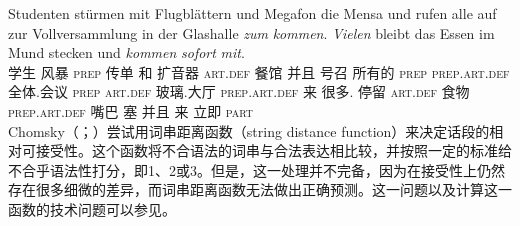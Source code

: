 \ea
\gll Studenten stürmen mit Flugblättern und Megafon die Mensa und rufen alle auf zur Vollversammlung in der Glashalle \emph{zum} \emph{kommen}. \emph{Vielen} bleibt das Essen im Mund stecken und \emph{kommen} \emph{sofort} \emph{mit}.\footnotemark\\
学生 风暴 \textsc{prep} 传单 和 扩音器 \textsc{art}.\textsc{def} 餐馆 并且 号召 所有的 \textsc{prep} \textsc{prep}.\textsc{art}.\textsc{def} 全体.会议 \textsc{prep} \textsc{art}.\textsc{def} 玻璃.大厅 \textsc{prep}.\textsc{art}.\textsc{def} 来 很多.\dat{} 停留 \textsc{art}.\textsc{def} 食物 \textsc{prep}.\textsc{art}.\textsc{def} 嘴巴 塞 并且 来 立即 \textsc{part}\\
\z
Chomsky（\citeyear[\S~5]{Chomsky75a}；\citeyear{Chomsky64a}）尝试用词串距离函数（string distance function）来决定话段的相对可接受性。这个函数将不合语法的词串与合法表达相比较，并按照一定的标准给不合乎语法性打分，即1、2或3。但是，这一处理并不完备，因为在接受性上仍然存在很多细微的差异，而词串距离函数无法做出正确预测。这一问题以及计算这一函数的技术问题可以参见。

